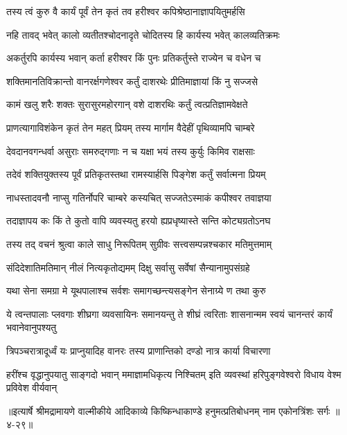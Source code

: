 \twolineshloka
{तस्य त्वं कुरु वै कार्यं पूर्वं तेन कृतं तव}
{हरीश्वर कपिश्रेष्ठानाज्ञापयितुमर्हसि} %

\twolineshloka
{नहि तावद् भवेत् कालो व्यतीतश्चोदनादृते}
{चोदितस्य हि कार्यस्य भवेत् कालव्यतिक्रमः} %

\twolineshloka
{अकर्तुरपि कार्यस्य भवान् कर्ता हरीश्वर}
{किं पुनः प्रतिकर्तुस्ते राज्येन च वधेन च} %

\twolineshloka
{शक्तिमानतिविक्रान्तो वानरर्क्षगणेश्वर}
{कर्तुं दाशरथेः प्रीतिमाज्ञायां किं नु सज्जसे} %

\twolineshloka
{कामं खलु शरैः शक्तः सुरासुरमहोरगान्}
{वशे दाशरथिः कर्तुं त्वत्प्रतिज्ञामवेक्षते} %

\twolineshloka
{प्राणत्यागाविशंकेन कृतं तेन महत् प्रियम्}
{तस्य मार्गाम वैदेहीं पृथिव्यामपि चाम्बरे} %

\twolineshloka
{देवदानवगन्धर्वा असुराः समरुद्गणाः}
{न च यक्षा भयं तस्य कुर्युः किमिव राक्षसाः} %

\twolineshloka
{तदेवं शक्तियुक्तस्य पूर्वं प्रतिकृतस्तथा}
{रामस्यार्हसि पिङ्गेश कर्तुं सर्वात्मना प्रियम्} %

\twolineshloka
{नाधस्तादवनौ नाप्सु गतिर्नोपरि चाम्बरे}
{कस्यचित् सज्जतेऽस्माकं कपीश्वर तवाज्ञया} %

\twolineshloka
{तदाज्ञापय कः किं ते कुतो वापि व्यवस्यतु}
{हरयो ह्यप्रधृष्यास्ते सन्ति कोट्यग्रतोऽनघ} %

\twolineshloka
{तस्य तद् वचनं श्रुत्वा काले साधु निरूपितम्}
{सुग्रीवः सत्त्वसम्पन्नश्चकार मतिमुत्तमाम्} %

\twolineshloka
{संदिदेशातिमतिमान् नीलं नित्यकृतोद्यमम्}
{दिक्षु सर्वासु सर्वेषां सैन्यानामुपसंग्रहे} %

\twolineshloka
{यथा सेना समग्रा मे यूथपालाश्च सर्वशः}
{समागच्छन्त्यसङ्गेन सेनाग्र्ये ण तथा कुरु} %

\threelineshloka
{ये त्वन्तपालाः प्लवगाः शीघ्रगा व्यवसायिनः}
{समानयन्तु ते शीघ्रं त्वरिताः शासनान्मम}
{स्वयं चानन्तरं कार्यं भवानेवानुपश्यतु} %

\twolineshloka
{त्रिपञ्चरात्रादूर्ध्वं यः प्राप्नुयादिह वानरः}
{तस्य प्राणान्तिको दण्डो नात्र कार्या विचारणा} %

\twolineshloka
{हरींश्च वृद्धानुपयातु साङ्गदो भवान् ममाज्ञामधिकृत्य निश्चितम्}
{इति व्यवस्थां हरिपुङ्गवेश्वरो विधाय वेश्म प्रविवेश वीर्यवान्} %


॥इत्यार्षे श्रीमद्रामायणे वाल्मीकीये आदिकाव्ये किष्किन्धाकाण्डे हनुमत्प्रतिबोधनम् नाम एकोनत्रिंशः सर्गः ॥४-२९॥
